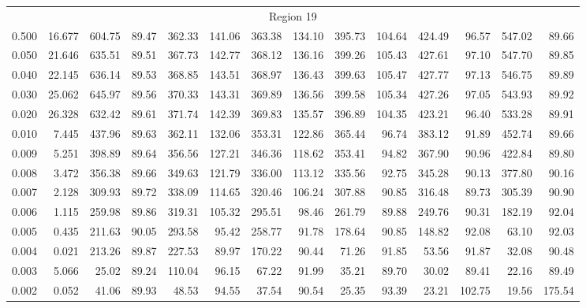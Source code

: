 \begin{tabular}{@{}lrrrrrrrrrrrrr@{}}
\midrule
\multicolumn{14}{c}{Region 19} \\
\cmidrule{1-14}
0.500 & 16.677 & 604.75 & 89.47 & 362.33 & 141.06 & 363.38 & 134.10 & 395.73 & 104.64 & 424.49 & 96.57 & 547.02 & 89.66 \\
0.050 & 21.646 & 635.51 & 89.51 & 367.73 & 142.77 & 368.12 & 136.16 & 399.26 & 105.43 & 427.61 & 97.10 & 547.70 & 89.85 \\
0.040 & 22.145 & 636.14 & 89.53 & 368.85 & 143.51 & 368.97 & 136.43 & 399.63 & 105.47 & 427.77 & 97.13 & 546.75 & 89.89 \\
0.030 & 25.062 & 645.97 & 89.56 & 370.33 & 143.31 & 369.89 & 136.56 & 399.58 & 105.34 & 427.26 & 97.05 & 543.93 & 89.92 \\
0.020 & 26.328 & 632.42 & 89.61 & 371.74 & 142.39 & 369.83 & 135.57 & 396.89 & 104.35 & 423.21 & 96.40 & 533.28 & 89.91 \\
0.010 & 7.445 & 437.96 & 89.63 & 362.11 & 132.06 & 353.31 & 122.86 & 365.44 & 96.74 & 383.12 & 91.89 & 452.74 & 89.66 \\
0.009 & 5.251 & 398.89 & 89.64 & 356.56 & 127.21 & 346.36 & 118.62 & 353.41 & 94.82 & 367.90 & 90.96 & 422.84 & 89.80 \\
0.008 & 3.472 & 356.38 & 89.66 & 349.63 & 121.79 & 336.00 & 113.12 & 335.56 & 92.75 & 345.28 & 90.13 & 377.80 & 90.16 \\
0.007 & 2.128 & 309.93 & 89.72 & 338.09 & 114.65 & 320.46 & 106.24 & 307.88 & 90.85 & 316.48 & 89.73 & 305.39 & 90.90 \\
0.006 & 1.115 & 259.98 & 89.86 & 319.31 & 105.32 & 295.51 & 98.46 & 261.79 & 89.88 & 249.76 & 90.31 & 182.19 & 92.04 \\
0.005 & 0.435 & 211.63 & 90.05 & 293.58 & 95.42 & 258.77 & 91.78 & 178.64 & 90.85 & 148.82 & 92.08 & 63.10 & 92.03 \\
0.004 & 0.021 & 213.26 & 89.87 & 227.53 & 89.97 & 170.22 & 90.44 & 71.26 & 91.85 & 53.56 & 91.87 & 32.08 & 90.48 \\
0.003 & 5.066 & 25.02 & 89.24 & 110.04 & 96.15 & 67.22 & 91.99 & 35.21 & 89.70 & 30.02 & 89.41 & 22.16 & 89.49 \\
0.002 & 0.052 & 41.06 & 89.93 & 48.53 & 94.55 & 37.54 & 90.54 & 25.35 & 93.39 & 23.21 & 102.75 & 19.56 & 175.54 \\


\end{tabular}
